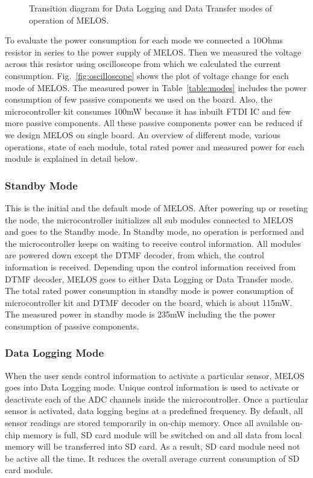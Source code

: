 \documentclass[10pt]{sigplan-proc-varsize}
\newcommand{\tabref}[1]{Table~\ref{#1}}
\newcommand{\figref}[1]{Fig.~\ref{#1}}
\newcommand{\melos}{MELOS }
\newcommand{\melosnospace}{MELOS}
\begin{document}
\begin{figure}
\centering
{}
\caption{Transition diagram for Data Logging and Data Transfer modes of operation of \melosnospace.}
\label{fig:statetransition}
\end{figure}

{}
To evaluate the power consumption for each mode we connected a 10Ohms resistor in series to the power supply of \melosnospace. Then we measured the voltage across this resistor using oscilloscope from which we calculated the current consumption. \figref{fig:oscilloscope} shows the plot of voltage change for each mode of \melosnospace. The measured power in  \tabref{table:modes} includes the power consumption of few passive components we used on the board. Also, the microcontroller kit consumes 100mW because it has inbuilt FTDI IC and few more passive components. All these passive components power can be reduced if we design \melos on single board. An overview of different mode, various operations, state of each module, total rated power and measured power for each module is explained in detail below.  

\subsubsection{Standby Mode}
This is the initial and the default mode of \melosnospace. After powering up or reseting the node, the microcontroller initializes all sub modules connected to \melos and goes to the Standby mode. In Standby mode, no operation is performed and the microcontroller keeps on waiting to receive control information. All modules are powered down except the DTMF decoder, from which, the control information is received. Depending upon the control information received from DTMF decoder, \melos goes to either Data Logging or Data Transfer mode. The total rated power consumption in standby mode is power consumption of microcontroller kit and DTMF decoder on the board, which is about 115mW. The measured power in standby mode is 235mW including the the power consumption of passive components.

\subsubsection{Data Logging Mode}
When the user sends control information to activate a particular sensor, \melos goes into Data Logging mode. Unique control information is used to activate or deactivate each of the ADC channels inside the microcontroller. Once a particular sensor is activated, data logging begins at a predefined frequency. By default, all sensor readings are stored temporarily in on-chip memory. Once all available on-chip memory is full, SD card module will be switched on and all data from local memory will be transferred into SD card. As a result, SD card module need not be active all the time. It reduces the overall average current consumption of SD card module.
\end{document}
